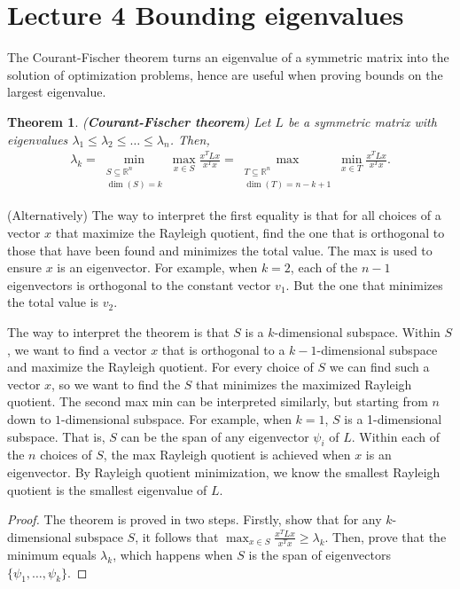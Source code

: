 \documentclass[]{article}
\newtheorem{theorem}{Theorem}[section]
\begin{document}
	\section{Lecture 4 Bounding eigenvalues}
	
	The Courant-Fischer theorem turns an eigenvalue of a symmetric matrix into the solution of optimization problems, hence are useful when proving bounds on the largest eigenvalue. 
	
	\begin{theorem} (\textbf{Courant-Fischer theorem})
		Let $L$ be a symmetric matrix with eigenvalues $\lambda_1 \le \lambda_2 \le \dots \le \lambda_n$. Then, 
		\begin{align*}
		\lambda_k 
		= \min_{\substack{S \subseteq \mathbb{R}^n \\ \dim(S) = k}} \max_{x \in S} \frac{x^T L x}{x^T x} 
		= \max_{\substack{T \subseteq \mathbb{R}^n \\ \dim(T) = n-k+1}} \min_{x \in T} \frac{x^T L x}{x^T x}.
		\end{align*}
	\end{theorem}
	(Alternatively) The way to interpret the first equality is that for all choices of a vector $x$ that maximize the Rayleigh quotient, find the one that is orthogonal to those that have been found and minimizes the total value. The max is used to ensure $x$ is an eigenvector. For example, when $k=2$, each of the $n-1$ eigenvectors is orthogonal to the constant vector $v_1$. But the one that minimizes the total value is $v_2$.
	
	The way to interpret the theorem is that $S$ is a $k$-dimensional subspace. Within $S$, we want to find a vector $x$ that is orthogonal to a $k-1$-dimensional subspace and maximize the Rayleigh quotient. For every choice of $S$ we can find such a vector $x$, so we want to find the $S$ that minimizes the maximized Rayleigh quotient. The second max min can be interpreted similarly, but starting from $n$ down to $1$-dimensional subspace. For example, when $k=1$, $S$ is a 1-dimensional subspace. That is, $S$ can be the span of any eigenvector $\psi_i$ of $L$. Within each of the $n$ choices of $S$, the max Rayleigh quotient is achieved when $x$ is an eigenvector. By Rayleigh quotient minimization, we know the smallest Rayleigh quotient is the smallest eigenvalue of $L$. 
	
	\begin{proof}
		The theorem is proved in two steps. Firstly, show that for any $k$-dimensional subspace $S$, it follows that $\max_{x \in S} \frac{x^T L x}{x^Tx} \ge \lambda_k$. Then, prove that the minimum equals $\lambda_k$, which happens when $S$ is the span of eigenvectors $\{\psi_1, \dots, \psi_k\}$. 
	\end{proof}
	
\end{document}

